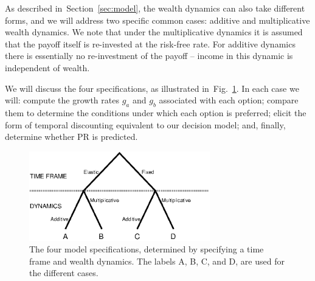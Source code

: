 \documentclass[11pt]{article}
\newcommand{\Sref}[1]{Section~\ref{sec:#1}}
\newcommand{\ie}{{\it i.e.}\ }
\newcommand{\flabel}[1]{\label{fig:#1}}
\newcommand{\fref}[1]{Fig.~\ref{fig:#1}}
\newcommand{\Dt}{\Delta t}
\numberwithin{equation}{section}
\begin{document}




As described in~\Sref{model}, the wealth dynamics can also take different forms, and we will address two specific common cases: additive and multiplicative wealth dynamics. We note that under the multiplicative dynamics it is assumed that the payoff itself is re-invested at the risk-free rate. For additive dynamics there is essentially no re-investment of the payoff -- income in this dynamic is independent of wealth.

We will discuss the four specifications, as illustrated in~\fref{tree}. In each case we will: compute the growth rates $g_a$ and $g_b$ associated with each option; compare them to determine the conditions under which each option is preferred; elicit the form of temporal discounting equivalent to our decision model; and, finally, determine whether PR is predicted.

\begin{figure}[!htb]
\centering
\includegraphics[width=0.7\textwidth]{./figures/tree.eps}
\caption{The four model specifications, determined by specifying a time frame and wealth dynamics. The labels A, B, C, and D, are used for the different cases.}
\flabel{tree}
\end{figure}
\end{document}
